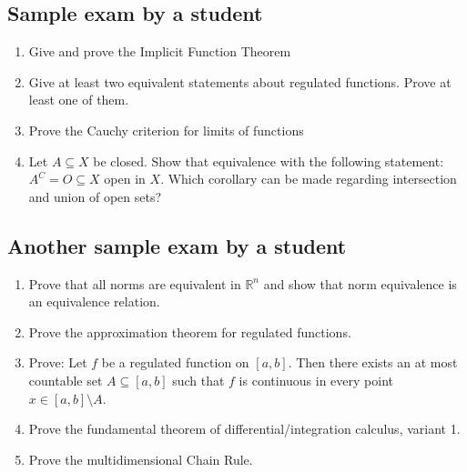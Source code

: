 \documentclass{article}
\begin{document}
\subsection*{Sample exam by a student}

\begin{enumerate}
  \item Give and prove the Implicit Function Theorem
  \item Give at least two equivalent statements about regulated functions. Prove at least one of them.
  \item Prove the Cauchy criterion for limits of functions
  \item Let $A \subseteq X$ be closed. Show that equivalence with the following statement: $A^C = O \subseteq X$ open in $X$.
    Which corollary can be made regarding intersection and union of open sets?
\end{enumerate}

\subsection*{Another sample exam by a student}

\begin{enumerate}
  \item Prove that all norms are equivalent in $\mathbb R^n$ and show that norm equivalence is an equivalence relation.
  \item Prove the approximation theorem for regulated functions.
  \item Prove: Let $f$ be a regulated function on $[a,b]$. Then there exists an at most countable set $A \subseteq [a,b]$ such that $f$ is continuous in every point $x \in [a,b] \setminus A$.
  \item Prove the fundamental theorem of differential/integration calculus, variant 1.
  \item Prove the multidimensional Chain Rule.
\end{enumerate}

\printindex
\end{document}
